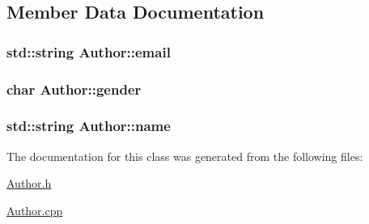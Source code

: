 \subsection{Member Data Documentation}
\subsubsection[{\texorpdfstring{email}{email}}]{\setlength{\rightskip}{0pt plus 5cm}std\+::string Author\+::email\hspace{0.3cm}{\ttfamily [private]}}\hypertarget{classAuthor_a8542e2f9c1f481b40665cb3b32f43c8e}{}\label{classAuthor_a8542e2f9c1f481b40665cb3b32f43c8e}
\subsubsection[{\texorpdfstring{gender}{gender}}]{\setlength{\rightskip}{0pt plus 5cm}char Author\+::gender\hspace{0.3cm}{\ttfamily [private]}}\hypertarget{classAuthor_a3e7bac289b21d7f97dc2bf14e56b9a14}{}\label{classAuthor_a3e7bac289b21d7f97dc2bf14e56b9a14}
\subsubsection[{\texorpdfstring{name}{name}}]{\setlength{\rightskip}{0pt plus 5cm}std\+::string Author\+::name\hspace{0.3cm}{\ttfamily [private]}}\hypertarget{classAuthor_a618f8527df84dc680f62a967f6f5e96e}{}\label{classAuthor_a618f8527df84dc680f62a967f6f5e96e}


The documentation for this class was generated from the following files\+:\begin{DoxyCompactItemize}
\item 
\hyperlink{Author_8h}{Author.\+h}\item 
\hyperlink{Author_8cpp}{Author.\+cpp}\end{DoxyCompactItemize}
